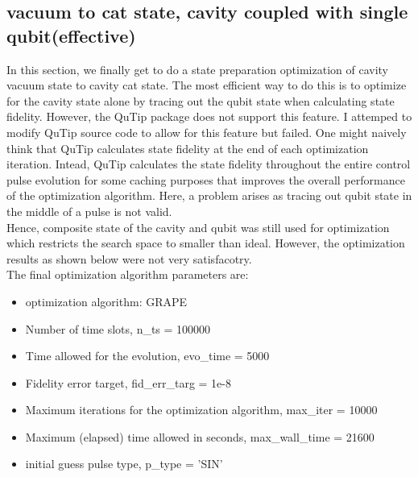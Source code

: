 \documentclass{article}
\begin{document}
\subsection{vacuum to cat state, cavity coupled with single qubit(effective)}
In this section, we finally get to do a state preparation optimization of cavity vacuum state to cavity cat state.
The most efficient way to do this is to optimize for the cavity state alone by tracing out the qubit state when calculating state fidelity. 
However, the QuTip package does not support this feature. I attemped to modify QuTip source code to allow for this feature but failed. 
One might naively think that QuTip calculates state fidelity at the end of each optimization iteration. 
Intead, QuTip calculates the state fidelity throughout the entire control pulse evolution for some caching purposes that improves the overall performance of the optimization algorithm. 
Here, a problem arises as tracing out qubit state in the middle of a pulse is not valid. 
\\
Hence, composite state of the cavity and qubit was still used for optimization which restricts the search space to smaller than ideal. 
However, the optimization results as shown below were not very satisfacotry. 
\\
The final optimization algorithm parameters are:
\\ 
\begin{itemize}
    \item optimization algorithm: GRAPE
    \item Number of time slots, n\_ts = 100000
    \item Time allowed for the evolution, evo\_time = 5000
    \item Fidelity error target, fid\_err\_targ = 1e-8
    \item Maximum iterations for the optimization algorithm, max\_iter = 10000
    \item Maximum (elapsed) time allowed in seconds, max\_wall\_time = 21600
    \item initial guess pulse type, p\_type = 'SIN'
\end{itemize}
\end{document}
